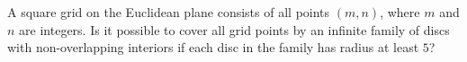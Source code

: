 A square grid on the Euclidean plane consists of all points $(m,n)$,  where $m$ and $n$ are integers. Is it possible to cover all grid points by an infinite family of discs with non-overlapping interiors if each disc in the family has radius at least $5$?